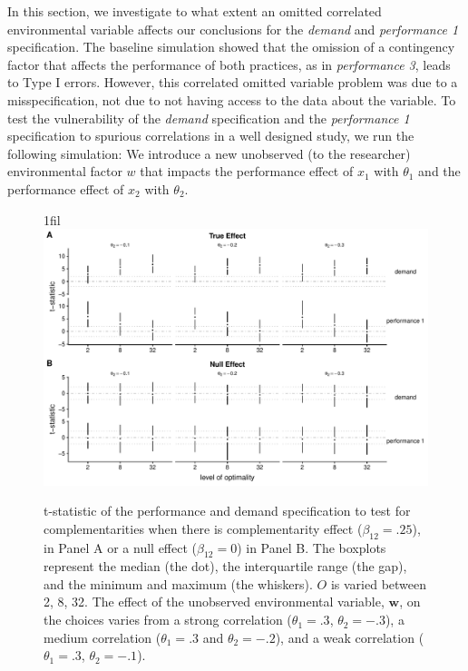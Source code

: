 \documentclass[12pt]{article}
\makeatletter
\newcommand*{\centerfloat}{%
  \parindent \z@
  \leftskip \z@ \@plus 1fil \@minus \textwidth
  \rightskip\leftskip
  \parfillskip \z@skip}
\makeatother
\begin{document}
In this section, we investigate to what extent an omitted correlated environmental variable affects our conclusions for the \emph{demand} and \emph{performance 1} specification. The baseline simulation showed that the omission of a contingency factor that affects the performance of both practices, as in \emph{performance 3}, leads to Type I errors. However, this correlated omitted variable problem was due to a misspecification, not due to not having access to the data about the variable. To test the vulnerability of the \emph{demand} specification and the \emph{performance 1} specification to spurious correlations in a well designed study, we run the following simulation: We introduce a new unobserved (to the researcher) environmental factor \(w\) that impacts the performance effect of \(x_1\) with \(\theta_1\) and the performance effect of \(x_2\) with \(\theta_2\). 

\begin{figure}
\centerfloat
\includegraphics[width=450px]{figure-latex/spurious_new_plot.pdf}
\caption[Error Rate and Power with Unobserved Environmental Variables]
{\label{spurious} t-statistic of the performance and demand specification to test
for complementarities when there is complementarity effect ($\beta_{12} = .25$),
in Panel A or a null effect ($\beta_{12} = 0$) in Panel B. The boxplots represent the median (the dot), the interquartile range (the gap), and the minimum and maximum (the whiskers). $O$ is varied between 2, 8, 32. The effect of the unobserved environmental variable, $\mathbf{w}$, on the choices varies from a strong correlation ($\theta_1 = .3$, $\theta_2 = -.3$), a medium correlation ($\theta_1 = .3$ and $\theta_2 = -.2$), and a weak correlation ($\theta_1 =.3$, $\theta_2 = -.1$).}
\end{figure}
\end{document}
